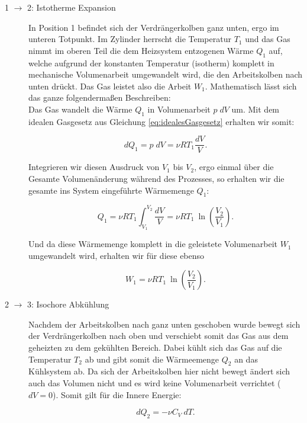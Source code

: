 \documentclass{article}
\begin{document}
\begin{description}
   \item[1 $\xrightarrow{}$ 2: Istotherme Expansion] In Position 1 befindet sich der Verdrängerkolben ganz unten, ergo im unteren Totpunkt. Im Zylinder herrscht die Temperatur $T_1$ und das Gas nimmt im oberen Teil die dem Heizsystem entzogenen Wärme $Q_1$ auf, welche aufgrund der konstanten Temperatur (isotherm) komplett in mechanische Volumenarbeit umgewandelt wird, die den Arbeitskolben nach unten drückt. Das Gas leistet also die Arbeit $W_1$. Mathematisch lässt sich das ganze folgendermaßen Beschreiben: \\
   Das Gas wandelt die Wärme $Q_1$ in Volumenarbeit $p \phantom{.} dV$ um. Mit dem idealen Gasgesetz aus Gleichung \ref{eq:idealesGasgesetz} erhalten wir somit:

   \begin{equation}
       dQ_1 = p \phantom{.} dV = \nu R T_1 \frac{dV}{V}.
   \end{equation}

   Integrieren wir diesen Ausdruck von $V_1$ bis $V_2$, ergo einmal über die Gesamte Volumenänderung während des Prozesses, so erhalten wir die gesamte ins System eingeführte Wärmemenge $Q_1$:

   \begin{equation}
       Q_1 = \nu R T_1 \int_{V_1}^{V_2} \frac{dV}{V} = \nu R T_1 \ \ln{\left( \frac{V_2}{V_1} \right)}.
   \end{equation}

   Und da diese Wärmemenge komplett in die geleistete Volumenarbeit $W_1$ umgewandelt wird, erhalten wir für diese ebenso

   \begin{equation}
       W_1 = \nu R T_1 \ \ln{\left( \frac{V_2}{V_1} \right)}.
   \end{equation}

   \phantom{.}
   \item[2 $\xrightarrow{}$ 3: Isochore Abkühlung] Nachdem der Arbeitskolben nach ganz unten geschoben wurde bewegt sich der Verdrängerkolben nach oben und verschiebt somit das Gas aus dem geheizten zu dem gekühlten Bereich. Dabei kühlt sich das Gas auf die Temperatur $T_2$ ab und gibt somit die Wärmeemenge $Q_2$ an das Kühlsystem ab. Da sich der Arbeitskolben hier nicht bewegt ändert sich auch das Volumen nicht und es wird keine Volumenarbeit verrichtet ($dV = 0$). Somit gilt für die Innere Energie:

   \begin{equation}
       dQ_2 = - \nu C_V \ dT.
   \end{equation}


\end{description}
\end{document}
